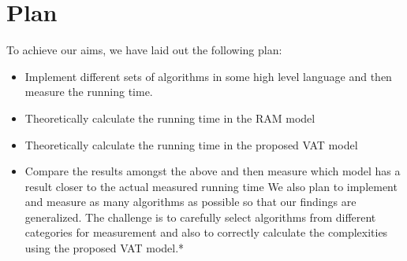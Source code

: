 \section{Plan}
To achieve our aims, we have laid out the following plan:
  \begin{itemize}
      \item Implement different sets of algorithms in some high level language
      and then measure the running time.
      \item Theoretically calculate the running time in the RAM model
      \item Theoretically calculate the running time in the proposed VAT model
      \item Compare the results amongst the above and then measure which model
has a result closer to the actual measured running time
We also plan to implement and measure as many algorithms as possible so that our findings are generalized. The challenge is to carefully select algorithms from different categories for measurement and also to correctly calculate the complexities using the proposed VAT model.*
  \end{itemize}